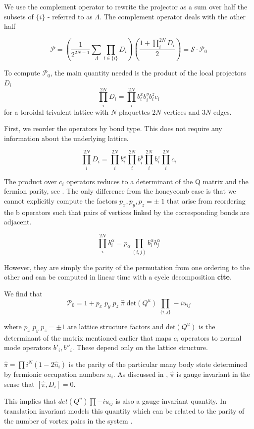 We use the complement operator to rewrite the projector as a sum over half the subsets of \(\{i\}\) - referred to as \(\Lambda\). The complement operator deals with the other half

\[ \mathcal{P} =  \left( \frac{1}{2^{2N-1}} \sum_{\Lambda} \prod_{i\in\{i\}} D_i\right) \left(\frac{1 + \prod_i^{2N} D_i}{2}\right) = \mathcal{S} \cdot \mathcal{P}_0\]

To compute \(\mathcal{P}_0\), the main quantity needed is the product of the local projectors \(D_i\) \[\prod_i^{2N} D_i = \prod_i^{2N} b^x_i b^y_i b^z_i c_i \] for a toroidal trivalent lattice with \(N\) plaquettes \(2N\) vertices and \(3N\) edges.

First, we reorder the operators by bond type. This does not require any information about the underlying lattice.

\[\prod_i^{2N} D_i = \prod_i^{2N} b^x_i \prod_i^{2N} b^y_i \prod_i^{2N} b^z_i \prod_i^{2N} c_i\]

The product over \(c_i\) operators reduces to a determinant of the Q matrix and the fermion parity, see \autocite{pedrocchiPhysicalSolutionsKitaev2011}. The only difference from the honeycomb case is that we cannot explicitly compute the factors \(p_x,p_y,p_z = \pm\;1\) that arise from reordering the b operators such that pairs of vertices linked by the corresponding bonds are adjacent.

\[\prod_i^{2N} b^\alpha_i = p_\alpha \prod_{(i,j)}b^\alpha_i b^\alpha_j\]

However, they are simply the parity of the permutation from one ordering to the other and can be computed in linear time with a cycle decomposition \textbf{cite}.

We find that \[\mathcal{P}_0 = 1 + p_x\;p_y\;p_z\; \hat{\pi} \; \mathrm{det}(Q^u) \; \prod_{\{i,j\}} -iu_{ij}\]

where \(p_x\;p_y\;p_z = \pm 1\) are lattice structure factors and \(\mathrm{det}(Q^u)\) is the determinant of the matrix mentioned earlier that maps \(c_i\) operators to normal mode operators \(b'_i, b''_i\). These depend only on the lattice structure.

\(\hat{\pi} = \prod{i}^{N} (1 - 2\hat{n}_i)\) is the parity of the particular many body state determined by fermionic occupation numbers \(n_i\). As discussed in \autocite{pedrocchiPhysicalSolutionsKitaev2011}, \(\hat{\pi}\) is gauge invariant in the sense that \([\hat{\pi}, D_i] = 0\).

This implies that \(det(Q^u) \prod -i u_{ij}\) is also a gauge invariant quantity. In translation invariant models this quantity which can be related to the parity of the number of vortex pairs in the system \autocite{yaoAlgebraicSpinLiquid2009}.

